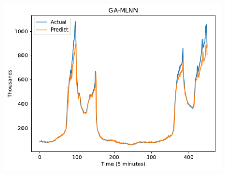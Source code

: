 \documentclass[11pt,twoside]{article}
\begin{document}
\begin{multicols}{2}
\begin{figure}[!ht]
\begin{minipage}[b]{0.33\linewidth}
    \centering
    \includegraphics[width=0.9\linewidth]{images/pdf/predict/k5/wc_k5_ga_mlnn.pdf} 
  \end{minipage} 
  

\end{figure}
\end{multicols}
\end{document}
